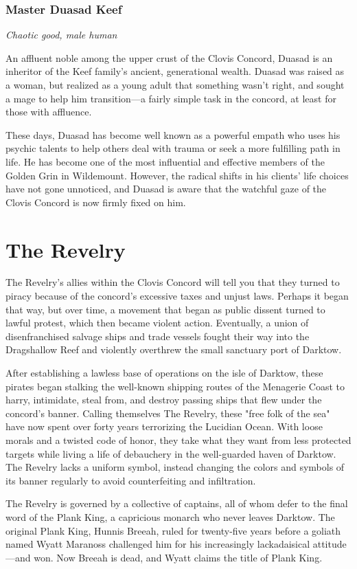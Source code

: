 \documentclass[10pt,a4paper,twoside,bg=print,twocolumn,openany,nodeprecatedcode]{dndbook}
\begin{document}
\subsubsection{Master Duasad Keef}
\textit{Chaotic good, male human}

An affluent noble among the upper crust of the Clovis Concord, Duasad is an inheritor of the Keef family's ancient, generational wealth. Duasad was raised as a woman, but realized as a young adult that something wasn't right, and sought a mage to help him transition—a fairly simple task in the concord, at least for those with affluence.

These days, Duasad has become well known as a powerful empath who uses his psychic talents to help others deal with trauma or seek a more fulfilling path in life. He has become one of the most influential and effective members of the Golden Grin in Wildemount. However, the radical shifts in his clients' life choices have not gone unnoticed, and Duasad is aware that the watchful gaze of the Clovis Concord is now firmly fixed on him.

\section{The Revelry}
The Revelry's allies within the Clovis Concord will tell you that they turned to piracy because of the concord's excessive taxes and unjust laws. Perhaps it began that way, but over time, a movement that began as public dissent turned to lawful protest, which then became violent action. Eventually, a union of disenfranchised salvage ships and trade vessels fought their way into the Dragshallow Reef and violently overthrew the small sanctuary port of Darktow.

After establishing a lawless base of operations on the isle of Darktow, these pirates began stalking the well-known shipping routes of the Menagerie Coast to harry, intimidate, steal from, and destroy passing ships that flew under the concord's banner. Calling themselves The Revelry, these "free folk of the sea" have now spent over forty years terrorizing the Lucidian Ocean. With loose morals and a twisted code of honor, they take what they want from less protected targets while living a life of debauchery in the well-guarded haven of Darktow. The Revelry lacks a uniform symbol, instead changing the colors and symbols of its banner regularly to avoid counterfeiting and infiltration.

The Revelry is governed by a collective of captains, all of whom defer to the final word of the Plank King, a capricious monarch who never leaves Darktow. The original Plank King, Hunnis Breeah, ruled for twenty-five years before a goliath named Wyatt Maranoss challenged him for his increasingly lackadaisical attitude—and won. Now Breeah is dead, and Wyatt claims the title of Plank King.
\end{document}
